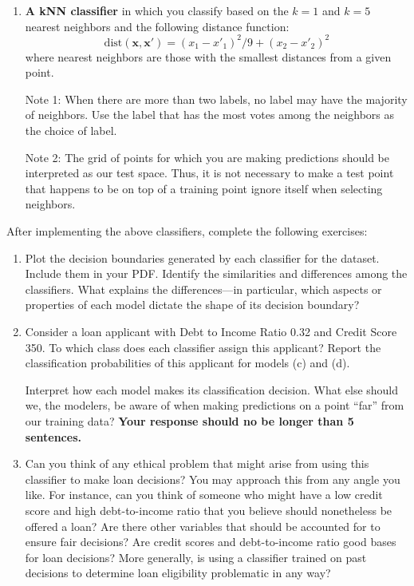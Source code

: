 \documentclass[submit]{../harvardml}
\begin{document}
\begin{problem}
\begin{enumerate}[label=\alph*)]
  \item \textbf{A kNN classifier} in which you classify based on the $k = 1$ and $k = 5$ nearest neighbors and the following distance function:
  \[\text{dist}(\boldsymbol{x}, \boldsymbol{x}') = (x_1 - x'_1)^2/9 + (x_2 - x'_2)^2\]
        where nearest neighbors are those with the smallest distances from a given point.

        Note 1: When there are more than two labels, no label may have the
        majority of neighbors.  Use the label that has the most votes among
        the neighbors as the choice of label.

        Note 2: The grid of points for which you are making predictions
        should be interpreted as our test space.  Thus, it is not necessary
        to make a test point that happens to be on top of a training point
        ignore itself when selecting neighbors.

\end{enumerate}

After implementing the above classifiers, complete the following exercises:
  \begin{enumerate}



      \item Plot the decision boundaries generated by each classifier for the dataset. Include them in your PDF.
            Identify the similarities and differences among the classifiers. What explains the differences---in particular, which aspects or properties of each model dictate the shape of its decision boundary?

      \item

            Consider a loan applicant with Debt to Income Ratio 0.32 and Credit Score 350. To which class does each classifier assign this applicant? Report the classification probabilities of this applicant for models (c) and (d).

            Interpret how each model makes its classification decision. What else should we, the modelers, be aware of when making predictions on a point ``far'' from our training data? \textbf{Your response should no be longer than 5 sentences.}

    \item
        Can you think of any ethical problem that might arise from using this classifier to make loan decisions? You may approach this from any angle you like. For instance, can you think of someone who might have a low credit score and high debt-to-income ratio that you believe should nonetheless be offered a loan? Are there other variables that should be accounted for to ensure fair decisions? Are credit scores and debt-to-income ratio good bases for loan decisions? More generally, is using a classifier trained on past decisions to determine loan eligibility problematic in any way?
    \end{enumerate}
\end{problem}
\end{document}
